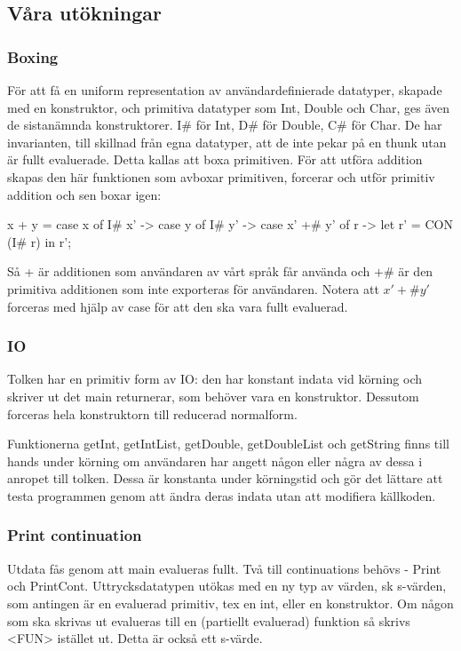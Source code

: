 \documentclass[../Core]{subfiles}
\begin{document}
\subsection{Våra utökningar}

\subsubsection{Boxing}

För att få en uniform representation av användardefinierade datatyper, skapade
med en konstruktor, och primitiva datatyper som Int, Double och Char, ges även 
de sistanämnda konstruktorer. I\# för Int, D\# för Double, C\# för Char. De har
invarianten, till skillnad från egna datatyper, att de inte pekar på en thunk
utan är fullt evaluerade. Detta kallas att boxa primitiven.
    För att utföra addition skapas den här funktionen som avboxar primitiven,
forcerar och utför primitiv addition och sen boxar igen:

\begin{codeEx}
x + y = case x of 
    { I# x' -> case y of
        { I# y' -> case x' +# y' of
            { r -> let r' = CON (I# r) in  r'}}};
\end{codeEx}

Så + är additionen som användaren av vårt språk får använda och $ +\# $ är den
primitiva additionen som inte exporteras för användaren. Notera att $ x' +\# y' $
forceras med hjälp av case för att den ska vara fullt evaluerad.

\subsubsection{IO}
Tolken har en primitiv form av IO: den har konstant indata vid körning och
skriver ut det main returnerar, som behöver vara en konstruktor. Dessutom
forceras hela konstruktorn till reducerad normalform.

Funktionerna getInt, getIntList, getDouble, getDoubleList och getString finns
till hands under körning om användaren har angett någon eller några av dessa
i anropet till tolken. Dessa är konstanta under körningstid och gör det
lättare att testa programmen genom att ändra deras indata utan att modifiera
källkoden.

\subsubsection{Print continuation}
Utdata fås genom att main evalueras fullt. Två till continuations behövs - 
Print och PrintCont. Uttrycksdatatypen utökas med en ny typ av värden, sk
s-värden, som antingen är en evaluerad primitiv, tex en int, eller en
konstruktor. Om någon som ska skrivas ut evalueras till en (partiellt evaluerad)
funktion så skrivs <FUN> istället ut. Detta är också ett s-värde.
\end{document}
